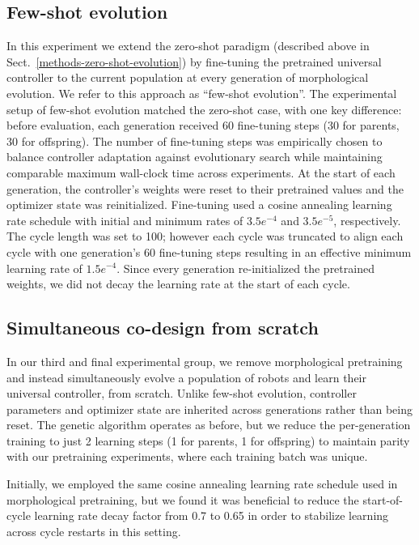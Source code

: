 \subsection{Few-shot evolution}
\label{methods-few-shot-evolution}

In this experiment we extend the zero-shot paradigm (described above in Sect.~\ref{methods-zero-shot-evolution}) by fine-tuning 
the pretrained universal controller 
to the current population
at every generation of morphological evolution.
We refer to this approach as ``few-shot evolution''.
% 
The experimental setup of few-shot evolution matched the zero-shot case, with one key difference: before evaluation, each generation received 60 fine-tuning steps (30 for parents, 30 for offspring).
The number of fine-tuning steps was
empirically chosen to balance controller adaptation against evolutionary search while maintaining comparable maximum wall-clock time across experiments. 
At the start of each generation, the controller's weights were reset to their pretrained values and the optimizer state was reinitialized. 
Fine-tuning used a cosine annealing learning rate schedule with initial and minimum rates of $3.5e^{-4}$ and $3.5e^{-5}$, respectively. The cycle length was set to 100; however each cycle was truncated to align each cycle with one generation's 60 fine-tuning steps resulting in an effective minimum learning rate of $1.5e^{-4}$. 
Since every generation re-initialized the pretrained weights, we did not decay the learning rate at the start of each cycle. 

\subsection{Simultaneous co-design from scratch}
\label{methods-codesign}

In our third and final experimental group, 
we remove morphological pretraining
and instead 
simultaneously 
evolve a population of robots
and
learn their universal controller, 
from scratch.
Unlike few-shot evolution, controller parameters and optimizer state are inherited across generations rather than being reset. The genetic algorithm operates as before, but we reduce the per-generation training to just 2 learning steps (1 for parents, 1 for offspring) to maintain parity with our pretraining experiments, where each training batch was unique.

Initially, we employed the same cosine annealing learning rate schedule used in morphological pretraining, but we found it was beneficial to reduce the start-of-cycle learning rate decay factor from 0.7 to 0.65 in order to stabilize learning across cycle restarts in this setting.